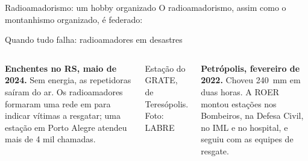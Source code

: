 \begin{frame}{Radioamadorismo: um hobby organizado}
  O radioamadorismo, assim como o montanhismo organizado, é \alert{federado}:

  \medskip
  \centering
\end{frame}

\begin{frame}{Quando tudo falha: radioamadores em desastres}
  \footnotesize
  \begin{columns}[T,onlytextwidth]
      \centering{}
      \raggedright
      \textbf{Enchentes no RS, maio de 2024.} Sem energia, as repetidoras saíram do ar. Os
      radioamadores formaram uma rede em  para indicar vítimas a resgatar; uma
      estação em Porto Alegre atendeu mais de 4 mil chamadas.

      \centering{}
        {Estação do GRATE, de Teresópolis. Foto: LABRE}
      \raggedright
      \textbf{Petrópolis, fevereiro de 2022.} Choveu \qty{240}{\milli\metre} em duas horas. A
      ROER montou estações nos Bombeiros, na Defesa Civil, no IML e no hospital, e seguiu com as
      equipes de resgate.
  \end{columns}
  \smallskip
\end{frame}

